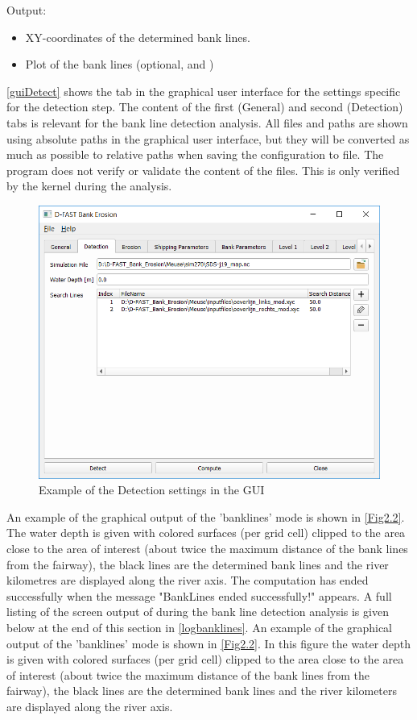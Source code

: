 Output:

\begin{itemize}
\item XY-coordinates of the determined bank lines.
\item Plot of the bank lines (optional,  and )
\end{itemize}

\autoref{guiDetect} shows the tab in the graphical user interface for the settings specific for the detection step.
The content of the first (General) and second (Detection) tabs is relevant for the bank line detection analysis.
All files and paths are shown using absolute paths in the graphical user interface, but they will be converted as much as possible to relative paths when saving the configuration to file.
The program does not verify or validate the content of the files.
This is only verified by the kernel during the analysis.

\begin{figure}[!b]
\center
\includegraphics[width=\textwidth]{figures/gui2.png}
\caption{Example of the Detection settings in the GUI}
\label{guiDetect}
\end{figure}

An example of the graphical output of the 'banklines' mode is shown in \autoref{Fig2.2}.
The water depth is given with colored surfaces (per grid cell) clipped to the area close to the area of interest (about twice the maximum distance of the bank lines from the fairway), the black lines are the determined bank lines and the river kilometres are displayed along the river axis.
The computation has ended successfully when the message "BankLines ended successfully!" appears.
A full listing of the screen output of \dfastbe during the bank line detection analysis is given below at the end of this section in \autoref{logbanklines}. An example of the graphical output of the 'banklines' mode is shown in \autoref{Fig2.2}. In this figure the water depth is given with colored surfaces (per grid cell) clipped to the area close to the area of interest (about twice the maximum distance of the bank lines from the fairway), the black lines are the determined bank lines and the river kilometers are displayed along the river axis. 


